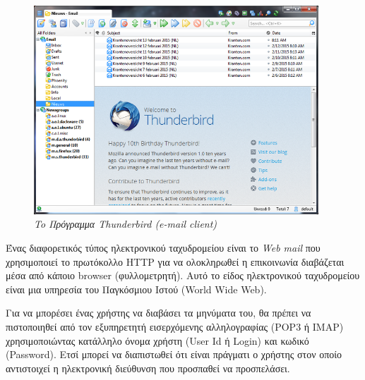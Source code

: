 \begin{figure}[!ht]
 \centering
 \includegraphics[width=0.95\textwidth]{images/chapter6/6-7}
 \caption {\textsl{To Πρόγραμμα Thunderbird (e-mail client)}}
 \label{6-7}
\end{figure}

Ένας διαφορετικός τύπος ηλεκτρονικού ταχυδρομείου είναι το \emph{Web mail} που χρησιμοποιεί το πρωτόκολλο HTTP για να ολοκληρωθεί η επικοινωνία διαβάζεται μέσα από κάποιο browser (φυλλομετρητή). Αυτό το είδος ηλεκτρονικού ταχυδρομείου είναι μια υπηρεσία του Παγκόσμιου Ιστού (World Wide Web). 

Για να μπορέσει ένας χρήστης να διαβάσει τα μηνύματα του, θα πρέπει να πιστοποιηθεί από τον εξυπηρετητή εισερχόμενης αλληλογραφίας (POP3 ή IMAP) χρησιμοποιώντας κατάλληλο όνομα χρήστη (User Id ή Login) και κωδικό (Password). Ετσί μπορεί να διαπιστωθεί ότι είναι πράγματι ο χρήστης στον οποίο αντιστοιχεί η ηλεκτρονική διεύθυνση που προσπαθεί να προσπελάσει.